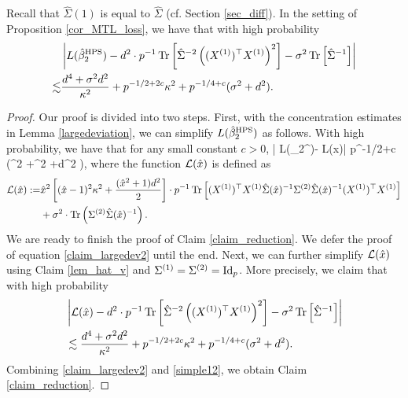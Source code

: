 \begin{claim}\label{claim_reduction}
Recall that $\hat \Sigma(1)$ is equal to $\hat \Sigma$ (cf. Section \ref{sec_diff}).
In the setting of Proposition \ref{cor_MTL_loss}, we have that with high probability
\begin{align*}
&\left|L(\hat{\beta}_2^{\MTL}) - d^2\cdot {p}^{-1}\tr\left[\hat\Sigma^{-2} \left((X^{(1)})^\top X^{(1)} \right)^2\right] -\sigma^2  \bigtr{{\hat \Sigma^{-1}  }}\right| \nonumber\\
\lesssim&  \frac{d^4 + \sigma^2 d^2}{\kappa^2}+p^{-1/2+2c}\kappa^2 +  p^{-1/4+c} (\sigma^2 +d^2).
\end{align*}
\end{claim}
\begin{proof}
Our proof is divided into two steps. First, with the concentration estimates in Lemma \ref{largedeviation}, we can simplify $L(\hat{\beta}_2^{\MTL})$ as follows. With high probability, we have that for any small constant $c>0$,
\be\label{claim_largedev2} \left| L(\hat{\beta}_2^{\MTL})- \cal L(\hat x)\right| \le p^{-1/2+c} \left(\sigma^2 +\kappa^2 +d^2 \right),
\ee
where the function $\cal L(\hat x)$ is defined as
\begin{align*}
	\cal L(\hat x)	:=  &\hat x^2\left[(\hat x-1)^2 \kappa^2 + \frac{(\hat x^2+1)d^2}2\right] \cdot p^{-1}\bigtr{ (X^{(1)})^{\top}X^{(1)} \hat\Sigma(\hat x)^{-1} \Sigma^{(2)} \hat\Sigma(\hat x)^{-1} (X^{(1)})^{\top}X^{(1)} } \\
	& +\sigma^2\cdot \tr\left(\Sigma^{(2)}\hat \Sigma(\hat x)^{-1}\right).
\end{align*}
We are ready to finish the proof of Claim \ref{claim_reduction}.
We defer the proof of equation \eqref{claim_largedev2} until the end.
Next, we can further simplify $\cal L(\hat x)$ using Claim \ref{lem_hat_v} and $\Sigma^{(1)}=\Sigma^{(2)}=\id_p$.
More precisely, we claim that with high probability
\begin{align}
&\left|\cal L(\hat x)- d^2\cdot {p}^{-1}\tr\left[\hat\Sigma^{-2} \left((X^{(1)})^\top X^{(1)} \right)^2\right] -\sigma^2  \bigtr{\hat \Sigma^{-1}  }\right| \nonumber\\
&\lesssim  \frac{d^4 + \sigma^2 d^2}{\kappa^2}+p^{-1/2+2c}\kappa^2 +  p^{-1/4+c} (\sigma^2 +d^2). \label{simple12}
\end{align}
Combining \eqref{claim_largedev2} and \eqref{simple12}, we obtain Claim \ref{claim_reduction}.


\end{proof}
